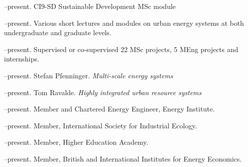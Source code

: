 \documentclass[11pt,a4paper]{article}
\begin{document}
--present.  CI{9-SD} Sustainable Development MSc module

--present. Various short lectures and modules on urban energy systems at both undergraduate and graduate levels.
 
--present. Supervised or co-supervised 22 MSc projects, 5 MEng projects and internships.

\bigskip
\noindent{}%
--present.  Stefan Pfenninger. \emph{Multi-scale energy systems}

--present.  Tom Ravalde. \emph{Highly integrated urban resource systems}


\bigskip

\noindent{}%
%
--present.  Member and Chartered Energy Engineer, Energy Institute.

--present.  Member, International Society for Industrial Ecology.

--present.  Member, Higher Education Academy.

--present.  Member, British and International Institutes for Energy Economics.
\end{document}
